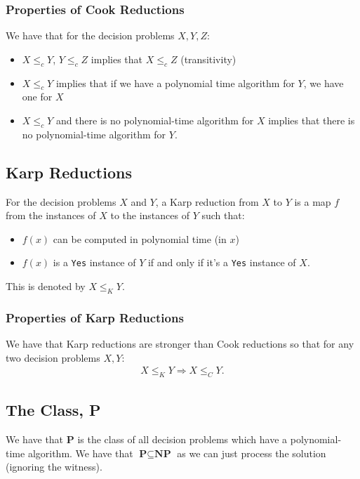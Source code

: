 \newpage

\subsubsection{Properties of Cook Reductions}

We have that for the decision problems $X, Y, Z$: \begin{itemize}
  \item $X \leq_c Y$, $Y \leq_c Z$ implies that $X \leq_c Z$ (transitivity)
  \item $X \leq_c Y$ implies that if we have a polynomial time algorithm for $Y$, 
  we have one for $X$
  \item $X \leq_c Y$ and there is no polynomial-time algorithm for $X$ implies 
  that there is no polynomial-time algorithm for $Y$.
\end{itemize}

\subsection{Karp Reductions}

For the decision problems $X$ and $Y$, a Karp reduction from $X$ to $Y$
is a map $f$ from the instances of $X$ to the instances of $Y$ such that:
\begin{itemize}
  \item $f(x)$ can be computed in polynomial time (in $x$)
  \item $f(x)$ is a \texttt{Yes} instance of $Y$ if and only if it's a \texttt{Yes} instance
  of $X$.
\end{itemize} This is denoted by $X \leq_K Y$.

\subsubsection{Properties of Karp Reductions}

We have that Karp reductions are stronger than Cook reductions so that for any two
decision problems $X, Y$: \begin{gather*}
    X \leq_K Y \Rightarrow X \leq_C Y.
\end{gather*}

\subsection{The Class, \textbf{P}}

We have that \textbf{P} is the class of all decision problems which have a polynomial-time
algorithm. We have that $\textbf{P} \subseteq \textbf{NP}$ as we can just process the solution
(ignoring the witness).

